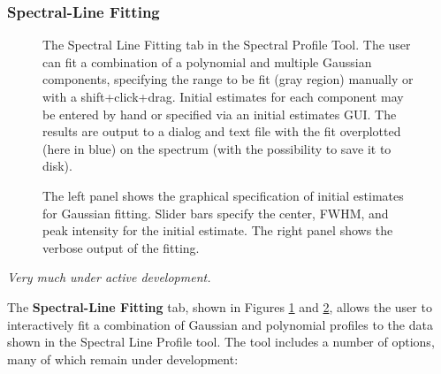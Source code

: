 \subsubsection{Spectral-Line Fitting}
\label{section:display.image.specprof.specfit}

\begin{figure}[h!]
\begin{center}
\caption{\label{fig:viewer_specproffit} The Spectral Line Fitting tab in the 
Spectral Profile Tool. The user can fit a combination of a polynomial and multiple Gaussian components,
specifying the range to be fit (gray region) manually or with a shift+click+drag. Initial estimates for each component
may be entered by hand or specified via an initial estimates GUI. The results are output to a dialog and text file with
the fit overplotted (here in blue) on the spectrum (with the possibility to save it to disk).}
\end{center}
\end{figure}

\begin{figure}[h!]
\begin{center}
\caption{\label{fig:viewer_specproffit_2} The left panel shows the graphical specification of initial estimates for Gaussian fitting.
Slider bars specify the center, FWHM, and peak intensity for the initial estimate. The right panel shows the verbose output of
the fitting.}
\hrulefill
\end{center}
\end{figure}

{\em Very much under active development.}

The {\bf Spectral-Line Fitting} tab, shown in Figures \ref{fig:viewer_specproffit} and \ref{fig:viewer_specproffit_2}, 
allows the user to interactively fit a combination of Gaussian and polynomial profiles to the data shown 
in the Spectral Line Profile tool. The tool includes a number of options, many of which remain under
development:

